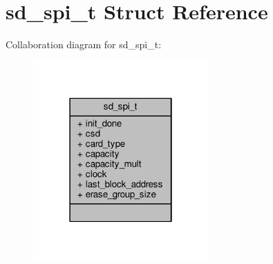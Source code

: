 \hypertarget{structsd__spi__t}{\section{sd\+\_\+spi\+\_\+t Struct Reference}
\label{structsd__spi__t}
}


Collaboration diagram for sd\+\_\+spi\+\_\+t\+:
\nopagebreak
\begin{figure}[H]
\begin{center}
\leavevmode
\includegraphics[width=190pt]{structsd__spi__t__coll__graph}
\end{center}
\end{figure}
